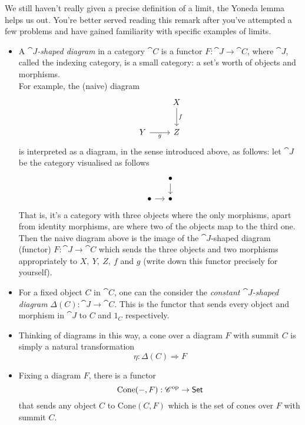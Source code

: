 \vspace*{0.1in}

\begin{discussion}\label{cone-adjunc}
We still haven't really given a precise definition of a limit, the Yoneda lemma helps us out. You're better served reading this remark after you've attempted a few problems and have gained familiarity with specific examples of limits. 
\begin{itemize}
\item A \emph{$\cat{J}$-shaped diagram} in a category $\cat{C}$ is a functor $F: \cat{J} \to \cat{C}$, where $\cat{J}$, called the indexing category, is a small category: a set's worth of objects and morphisms.\\[1em]
For example, the (naive) diagram 
\[\begin{tikzcd}[row sep=large]
 & X \arrow[d, "f"] \\[-0.5em]
Y \arrow[r, "g"']                                              & Z               
\end{tikzcd}\]
is interpreted as a diagram, in the sense introduced above, as follows: let $\cat{J}$ be the category visualised as follows
\[\begin{tikzcd}[column sep=small]
 & \bullet \arrow[d] \\[-0.5em]
\bullet \arrow[r]                                              & \bullet               
\end{tikzcd}\]
That is, it's a category with three objects where the only morphisms, apart from identity morphisms, are where two of the objects map to the third one. Then the naive diagram above is the image of the $\cat{J}$-shaped diagram (functor) $F:\cat{J} \to \cat{C}$ which sends the three objects and two morphisms appropriately to $X,\ Y,\ Z,\ f$ and $g$ (write down this functor precisely for yourself).
\item For a fixed object $C$ in $\cat{C}$, one can the consider the \emph{constant $\cat{J}$-shaped diagram} $\Delta(C):\cat{J} \to \cat{C}$. This is the functor that sends every object and morphism in $\cat{J}$ to $C$ and $1_C$ respectively.
\item Thinking of diagrams in this way, a cone over a diagram $F$ with summit $C$ is simply a natural transformation
\[\eta:\Delta(C) \Rightarrow F\]
\item Fixing a diagram $F$, there is a functor 
\[\mathrm{Cone}(-,F):\mathscr{C}^{\text{op}} \to \mathsf{Set}\]
that sends any object $C$ to $\mathrm{Cone}(C,F)$ which is the set of cones over $F$ with summit $C$. 

\end{itemize}
\end{discussion}
